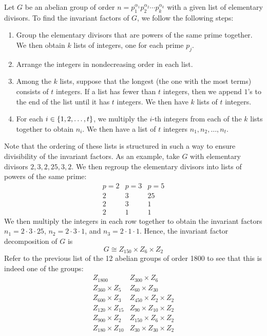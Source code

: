\ex Let $G$ be an abelian group of order $n = p_1^{\alpha_1} p_2^{\alpha_2} \cdots p_k^{\alpha_k}$ with a given list of elementary divisors. To find the invariant factors of $G$, we follow the following steps:
\begin{enumerate}
    \item Group the elementary divisors that are powers of the same prime together. We then obtain $k$ lists of integers, one for each prime $p_j$.
    \item Arrange the integers in nondecreasing order in each list.
    \item Among the $k$ lists, suppose that the longest (the one with the most terms) consists of $t$ integers. If a list has fewer than $t$ integers, then we append $1$'s to the end of the list until it has $t$ integers. We then have $k$ lists of $t$ integers.
    \item For each $i \in \{1, 2, \ldots, t\}$, we multiply the $i$-th integers from each of the $k$ lists together to obtain $n_i$. We then have a list of $t$ integers $n_1, n_2, \ldots, n_t$.
\end{enumerate}

Note that the ordering of these lists is structured in such a way to ensure divisibility of the invariant factors. As an example, take $G$ with elementary divisors $2, 3, 2, 25, 3, 2$. We then regroup the elementary divisors into lists of powers of the same prime:
\[
\begin{array}{c|c|c}
    p = 2 & p = 3 & p = 5 \\
    \hline
    2 & 3 & 25 \\
    2 & 3 & 1 \\
    2 & 1 & 1
\end{array}\]
We then multiply the integers in each row together to obtain the invariant factors $n_1 = 2 \cdot 3 \cdot 25$, $n_2 = 2 \cdot 3 \cdot 1$, and $n_3 = 2 \cdot 1 \cdot 1$. Hence, the invariant factor decomposition of $G$ is
\[G \cong Z_{150} \times Z_6 \times Z_2\]
Refer to the previous list of the 12 abelian groups of order 1800 to see that this is indeed one of the groups:
\[
\begin{array}{ll}
    Z_{1800} & Z_{300} \times Z_6 \\
    Z_{360} \times Z_5 & Z_{60} \times Z_{30} \\
    Z_{600} \times Z_3 & Z_{450} \times Z_2 \times Z_2 \\
    Z_{120} \times Z_{15} & Z_{90} \times Z_{10} \times Z_2 \\
    Z_{900} \times Z_2 & Z_{150} \times Z_6 \times Z_2 \\
    Z_{180} \times Z_{10} & Z_{30} \times Z_{30} \times Z_2
\end{array}\]

